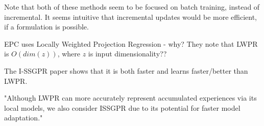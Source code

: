 \documentclass[a4paper]{article}
\begin{document}
Note that both of these methods seem to be focused on batch training, instead of incremental. It seems intuitive that incremental updates would be more efficient, if a formulation is possible. 

EPC uses Locally Weighted Projection Regression - why? They note that LWPR is $O(dim(z))$, where $z$ is input dimensionality?? 

The I-SSGPR paper shows that it is both faster and learns faster/better than LWPR. 

"Although LWPR can more accurately represent accumulated experiences via its local models, we also consider ISSGPR due to its potential for faster model adaptation."



\end{document}
